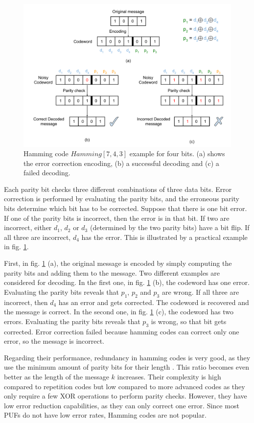 \begin{figure}[t]
    \centering
    \includegraphics[width=12cm]{images/Hamming ECC.pdf}
    \caption{Hamming code $Hamming[7,4,3]$ example for four bits. (a) shows the error correction encoding, (b) a successful decoding and (c) a failed decoding. }
    \label{fig:HammingECC}
\end{figure}

Each parity bit checks three different combinations of three data bits. Error correction is performed by evaluating the parity bits, and the erroneous parity bits determine which bit has to be corrected. Suppose that there is one bit error. If one of the parity bits is incorrect, then the error is in that bit. If two are incorrect, either $d_1$, $d_2$ or $d_3$ (determined by the two parity bits) have a bit flip. If all three are incorrect, $d_4$ has the error. This is illustrated by a practical example in fig. \ref{fig:HammingECC}.

First, in fig. \ref{fig:HammingECC} (a), the original message is encoded by simply computing the parity bits and adding them to the message. Two different examples are considered for decoding. In the first one, in fig. \ref{fig:HammingECC} (b), the codeword has one error. Evaluating the parity bits reveals that $p_1$, $p_2$ and $p_3$ are wrong. If all three are incorrect, then $d_4$ has an error and gets corrected. The codeword is recovered and the message is correct. In the second one, in fig. \ref{fig:HammingECC} (c), the codeword has two errors. Evaluating the parity bits reveals that $p_3$ is wrong, so that bit gets corrected. Error correction failed because hamming codes can correct only one error, so the message is incorrect. 


Regarding their performance, redundancy in hamming codes is very good, as they use the minimum amount of parity bits for their length \cite{Huffman2003}. This ratio becomes even better as the length of the message $k$ increases.  Their complexity is high compared to repetition codes but low compared to more advanced codes as they only require a few XOR operations to perform parity checks. However, they have low error reduction capabilities, as they can only correct one error. Since most PUFs do not have low error rates, Hamming codes are not popular. 


